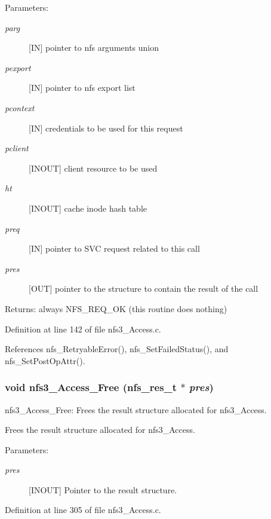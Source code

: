 \begin{Desc}
\item[Parameters:]
\begin{description}
\item[{\em parg}][IN] pointer to nfs arguments union \item[{\em pexport}][IN] pointer to nfs export list \item[{\em pcontext}][IN] credentials to be used for this request \item[{\em pclient}][INOUT] client resource to be used \item[{\em ht}][INOUT] cache inode hash table \item[{\em preq}][IN] pointer to SVC request related to this call \item[{\em pres}][OUT] pointer to the structure to contain the result of the call\end{description}
\end{Desc}
\begin{Desc}
\item[Returns:]always NFS\_\-REQ\_\-OK (this routine does nothing) \end{Desc}


Definition at line 142 of file nfs3\_\-Access.c.

References nfs\_\-Retryable\-Error(), nfs\_\-Set\-Failed\-Status(), and nfs\_\-Set\-Post\-Op\-Attr().
\subsubsection{\setlength{\rightskip}{0pt plus 5cm}void nfs3\_\-Access\_\-Free (nfs\_\-res\_\-t $\ast$ {\em pres})}\label{nfs3__Access_8c_a1}


nfs3\_\-Access\_\-Free: Frees the result structure allocated for nfs3\_\-Access.

Frees the result structure allocated for nfs3\_\-Access.

\begin{Desc}
\item[Parameters:]
\begin{description}
\item[{\em pres}][INOUT] Pointer to the result structure. \end{description}
\end{Desc}


Definition at line 305 of file nfs3\_\-Access.c.